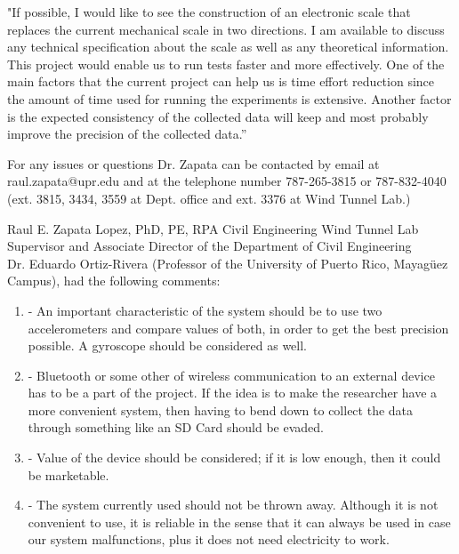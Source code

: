 	"If possible, I would like to see the construction of an electronic scale that replaces the current mechanical scale in two directions. I am available to discuss any technical specification about the scale as well as any theoretical information. This project would enable us to run tests faster and more effectively. One of the main factors that the current project can help us is time effort reduction since the amount of time used for running the experiments is extensive. Another factor is the expected consistency of the collected data will keep and most probably improve the precision of the collected data.”
 
 	For any issues or questions Dr. Zapata can be contacted by email at raul.zapata@upr.edu and at the telephone number 787-265-3815 or 787-832-4040 (ext. 3815, 3434, 3559 at Dept. office and ext. 3376 at Wind Tunnel Lab.)

	Raul E. Zapata Lopez, PhD, PE, RPA
	Civil Engineering Wind Tunnel Lab Supervisor and
	Associate Director of the Department of Civil Engineering \\
	
	Dr. Eduardo Ortiz-Rivera (Professor of  the University of Puerto Rico, Mayagüez Campus), had the following comments:
	
	\begin{enumerate}
		\item -	An important characteristic of the system should be to use two accelerometers and compare values of both, in order to get the best precision possible. A gyroscope should be considered as well.
		\item - Bluetooth or some other of wireless communication to an external device has to be a part of the project. If the idea is to make the researcher have a more convenient system, then having to bend down to collect the data through something like an SD Card should be evaded.
		\item -	Value of the device should be considered; if it is low enough, then it could be marketable.
		\item - The system currently used should not be thrown away. Although it is not convenient to use, it is reliable in the sense that it can always be used in case our system malfunctions, plus it does not need electricity to work. 

 
 		
	\end{enumerate}
	

